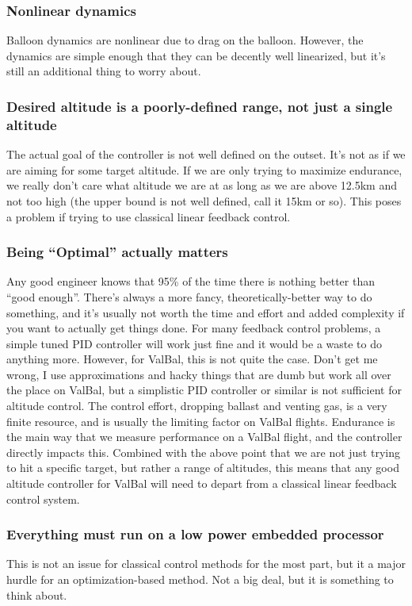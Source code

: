 \documentclass[11pt]{article}
\begin{document}
\subsubsection{Nonlinear dynamics}
Balloon dynamics are nonlinear due to drag on the balloon. However, the dynamics are simple enough that they can be decently well linearized, but it's still an additional thing to worry about.

\subsubsection{Desired altitude is a poorly-defined range, not just a single altitude}
The actual goal of the controller is not well defined on the outset. It's not as if we are aiming for some target altitude. If we are only trying to maximize endurance, we really don't care what altitude we are at as long as we are above 12.5km and not too high (the upper bound is not well defined, call it 15km or so). This poses a problem if trying to use classical linear feedback control.

\subsubsection{Being ``Optimal'' actually matters}
Any good engineer knows that 95\% of the time there is nothing better than ``good enough''. There's always a more fancy, theoretically-better way to do something, and it's usually not worth the time and effort and added complexity if you want to actually get things done. For many feedback control problems, a simple tuned PID controller will work just fine and it would be a waste to do anything more. However, for ValBal, this is not quite the case. Don't get me wrong, I use approximations and hacky things that are dumb but work all over the place on ValBal, but a simplistic PID controller or similar is not sufficient for altitude control. The control effort, dropping ballast and venting gas, is a very finite resource, and is usually the limiting factor on ValBal flights. Endurance is the main way that we measure performance on a ValBal flight, and the controller directly impacts this. Combined with the above point that we are not just trying to hit a specific target, but rather a range of altitudes, this means that any good altitude controller for ValBal will need to depart from a classical linear feedback control system.

\subsubsection{Everything must run on a low power embedded processor}
This is not an issue for classical control methods for the most part, but it a major hurdle for an optimization-based method. Not a big deal, but it is something to think about. 
\end{document}
